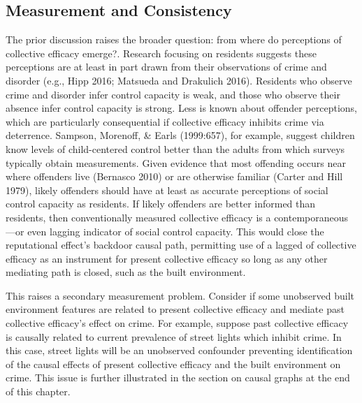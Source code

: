 \documentclass [11pt, proquest] {uwthesis}[2015/03/03]
\begin{document}
\hypertarget{measurement-and-consistency}{%
\subsection{Measurement and Consistency}\label{measurement-and-consistency}}

The prior discussion raises the broader question: from where do perceptions of collective efficacy emerge?. Research focusing on residents suggests these perceptions are at least in part drawn from their observations of crime and disorder (e.g., Hipp 2016; Matsueda and Drakulich 2016). Residents who observe crime and disorder infer control capacity is weak, and those who observe their absence infer control capacity is strong. Less is known about offender perceptions, which are particularly consequential if collective efficacy inhibits crime via deterrence. Sampson, Morenoff, \& Earls (1999:657), for example, suggest children know levels of child-centered control better than the adults from which surveys typically obtain measurements. Given evidence that most offending occurs near where offenders live (Bernasco 2010) or are otherwise familiar (Carter and Hill 1979), likely offenders should have at least as accurate perceptions of social control capacity as residents. If likely offenders are better informed than residents, then conventionally measured collective efficacy is a contemporaneous---or even lagging indicator of social control capacity. This would close the reputational effect's backdoor causal path, permitting use of a lagged of collective efficacy as an instrument for present collective efficacy so long as any other mediating path is closed, such as the built environment.

This raises a secondary measurement problem. Consider if some unobserved built environment features are related to present collective efficacy and mediate past collective efficacy's effect on crime. For example, suppose past collective efficacy is causally related to current prevalence of street lights which inhibit crime. In this case, street lights will be an unobserved confounder preventing identification of the causal effects of present collective efficacy and the built environment on crime. This issue is further illustrated in the section on causal graphs at the end of this chapter.
\end{document}
